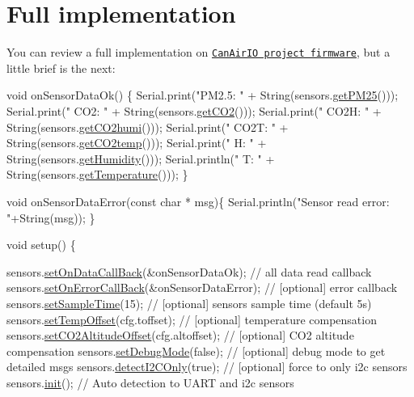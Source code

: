 \section*{Full implementation}

You can review a full implementation on \href{https://github.com/kike-canaries/canairio_firmware/blob/master/src/main.cpp}{\tt Can\+Air\+IO project firmware}, but a little brief is the next\+:


\begin{DoxyCode}
\textcolor{keywordtype}{void} onSensorDataOk() \{
    Serial.print(\textcolor{stringliteral}{"PM2.5: "} + String(sensors.\hyperlink{classSensors_adc3ad26b8a9be10b2100e3b023fdefc4}{getPM25}()));
    Serial.print(\textcolor{stringliteral}{" CO2: "}  + String(sensors.\hyperlink{classSensors_ad953d4564cc20d8134cccd962435dd81}{getCO2}()));
    Serial.print(\textcolor{stringliteral}{" CO2H: "} + String(sensors.\hyperlink{classSensors_a7fa1fe8f4f3469bce9311be880c243df}{getCO2humi}()));
    Serial.print(\textcolor{stringliteral}{" CO2T: "} + String(sensors.\hyperlink{classSensors_a7afb5c201c4e1933c96719e632181f71}{getCO2temp}()));
    Serial.print(\textcolor{stringliteral}{" H: "}    + String(sensors.\hyperlink{classSensors_a255bf73cd4afaf6c656dbbcabb1a8bb1}{getHumidity}()));
    Serial.println(\textcolor{stringliteral}{" T: "}  + String(sensors.\hyperlink{classSensors_ac4c22766994b94a2a28158ed72dc4a0c}{getTemperature}()));
\}

\textcolor{keywordtype}{void} onSensorDataError(\textcolor{keyword}{const} \textcolor{keywordtype}{char} * msg)\{
    Serial.println(\textcolor{stringliteral}{"Sensor read error: "}+String(msg));
\}

\textcolor{keywordtype}{void} setup() \{

    sensors.\hyperlink{classSensors_a729f911e0508cc8814a2276ff519b219}{setOnDataCallBack}(&onSensorDataOk);     \textcolor{comment}{// all data read callback}
    sensors.\hyperlink{classSensors_aba1b7a633d1d89514c891220b603351f}{setOnErrorCallBack}(&onSensorDataError); \textcolor{comment}{// [optional] error callback}
    sensors.\hyperlink{classSensors_ac723c0d9cf5af5daa0fa8d041f41f3d8}{setSampleTime}(15);                      \textcolor{comment}{// [optional] sensors sample time (default
       5s)}
    sensors.\hyperlink{classSensors_a122c0d2922d2a80984e8a3ac21b883c3}{setTempOffset}(cfg.toffset);             \textcolor{comment}{// [optional] temperature compensation}
    sensors.\hyperlink{classSensors_a27eec756609a421b3927c0dc132ae7c6}{setCO2AltitudeOffset}(cfg.altoffset);    \textcolor{comment}{// [optional] CO2 altitude
       compensation}
    sensors.\hyperlink{classSensors_ac749e2c2618a177afa7d72ce68573fa5}{setDebugMode}(\textcolor{keyword}{false});                    \textcolor{comment}{// [optional] debug mode to get detailed
       msgs}
    sensors.\hyperlink{classSensors_ae25465fbd64d3b2b9ae31e2cb5a4b246}{detectI2COnly}(\textcolor{keyword}{true});                    \textcolor{comment}{// [optional] force to only i2c sensors}
    sensors.\hyperlink{classSensors_a019efdf3e65081e9ace94e1f05338e4b}{init}();                                 \textcolor{comment}{// Auto detection to UART and i2c sensors}


\end{DoxyCode}
